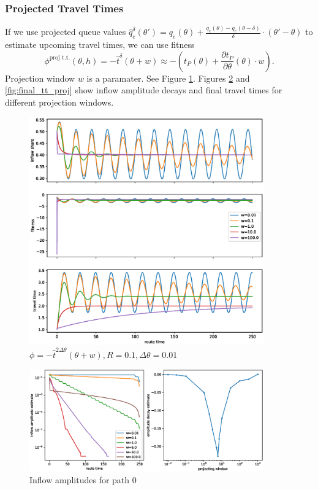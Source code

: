 \documentclass[12pt]{article}
\begin{document}
\subsubsection*{Projected Travel Times}

If we use projected queue values $\hat{q}^{\delta}_e(\theta') = q_e(\theta) + \frac{q_e(\theta) - q_e(\theta - \delta)}{\delta} \cdot (\theta' - \theta)$ to estimate upcoming travel times, we can use fitness $$ \phi^{\text{proj t.t.}}(\theta, h) = - \hat{t}^{\delta} ( \theta + w) \approx -(t_P(\theta) + \frac{\partial t_P}{\partial \theta}(\theta) \cdot w ). $$  
Projection window $w$ is a paramater. See Figure \ref{fig:fluctuations_proj}. Figures \ref{fig:amplitudes_proj} and \ref{fig:final_tt_proj} show inflow amplitude decays and final travel times for different projection windows.

\begin{figure}
	\includegraphics[width=0.9\textwidth]{img/replicator_proj_tt.eps}
	\caption{ $ \phi = -\hat{t}^{2\Delta \theta}(\theta + w), R=0.1, \Delta \theta = 0.01$}
	\label{fig:fluctuations_proj}

\end{figure}
	
\begin{figure}
	\includegraphics[width=0.9\textwidth]{img/amplitudes_proj_tt.eps}
	\caption{ Inflow amplitudes for path 0 }
	\label{fig:amplitudes_proj}

\end{figure}
\end{document}
